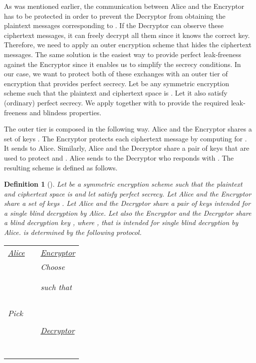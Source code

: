 \documentclass[10pt,journal]{IEEEtran}
\newtheorem{definition}{Definition}[section]
\begin{document}
As was mentioned earlier, the communication between Alice and the Encryptor has to be protected 
in order to prevent
the Decryptor from obtaining
the plaintext messages corresponding to . If the Decryptor can observe these ciphertext messages,
it can freely decrypt all them since it knows the correct key. Therefore,
we need to apply an outer encryption scheme that hides the ciphertext messages.
The same solution is
the easiest way to provide perfect leak-freeness against the Encryptor
since it enables us to simplify
the secrecy conditions.
In our case, we want to protect both of these exchanges
with an outer tier of encryption that provides perfect secrecy.
Let  be any symmetric encryption scheme
such that the plaintext and ciphertext space is .
Let it also satisfy (ordinary) perfect secrecy.
We apply  together
with  to provide the required leak-freeness and blindess properties.


The outer tier is composed in the following way. Alice and the Encryptor shares
a set of keys . The Encryptor protects each ciphertext message
by computing  for . It sends
 to Alice. Similarly, Alice and the Decryptor
share a pair of keys  that are used to protect
 and . Alice sends  to the Decryptor
who responds with .
The resulting scheme  is defined as follows.
\begin{definition}[]
\label{def:the_final_scheme}
Let  be a symmetric encryption scheme
such that the plaintext and ciphertext space is  and
let  satisfy perfect secrecy.
Let Alice and the Encryptor share a set of keys . Let
Alice and the Decryptor share a pair of keys  intended for
a single blind decryption by Alice. Let also the Encryptor and the Decryptor
share a blind decryption key , where ,
that is intended for single blind decryption
by Alice.  is determined by the following protocol.
\begin{center}
\begin{tabular}{|lll|}
\hline
\underline{Alice} & & \underline{Encryptor} \\
& & Choose  \\
& &  \\ & &  \\
& & such that \\
& & \\
& &  \\
 &  &  \\
 & & \\
Pick  & & \\
 & & \\
 & & \underline{Decryptor}\\
 &  &  \\
& &  \\
& &  \\
& &  \\
 &  &  \\
 & & \\
 & & \\
\hline
\end{tabular}
\end{center}
\end{definition}
\end{document}
